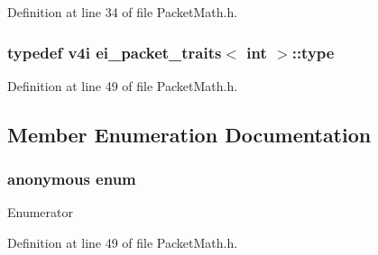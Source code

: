 Definition at line 34 of file Packet\-Math.\-h.

\hypertarget{structei__packet__traits_3_01int_01_4_ab8a742bbade9c5789e2b1790f3739605}{
\subsubsection[{type}]{\setlength{\rightskip}{0pt plus 5cm}typedef {\bf v4i} {\bf ei\-\_\-packet\-\_\-traits}$<$ {\bf int} $>$\-::{\bf type}}}\label{structei__packet__traits_3_01int_01_4_ab8a742bbade9c5789e2b1790f3739605}


Definition at line 49 of file Packet\-Math.\-h.



\subsection{Member Enumeration Documentation}
\hypertarget{structei__packet__traits_3_01int_01_4_a988296217bf7d17e474744cd5c47b113}{\subsubsection[{anonymous enum}]{\setlength{\rightskip}{0pt plus 5cm}anonymous enum}}\label{structei__packet__traits_3_01int_01_4_a988296217bf7d17e474744cd5c47b113}
\begin{Desc}
\item[Enumerator]\par
\begin{description}
\item[{\em 
\hypertarget{structei__packet__traits_3_01int_01_4_a8c99f9f13488f4720418b2975399d685ad774a4185410059fc6fdcd019df72d25}{size}\label{structei__packet__traits_3_01int_01_4_a8c99f9f13488f4720418b2975399d685ad774a4185410059fc6fdcd019df72d25}
}]\end{description}
\end{Desc}


Definition at line 49 of file Packet\-Math.\-h.

